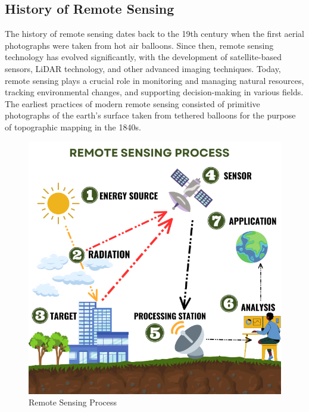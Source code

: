 \documentclass[conference]{IEEEtran}
\begin{document}
\subsection{History of Remote Sensing}
The history of remote sensing dates back to the 19th century when the first aerial photographs were taken from hot air balloons. Since then, remote sensing technology has evolved significantly, with the development of satellite-based sensors, LiDAR technology, and other advanced imaging techniques. Today, remote sensing plays a crucial role in monitoring and managing natural resources, tracking environmental changes, and supporting decision-making in various fields. The earliest practices of modern remote sensing consisted of primitive photographs of the earth’s surface taken from tethered balloons for the purpose of topographic mapping in the 1840s.

\begin{figure}
    \centering
    \includegraphics[width=\linewidth]{images/rs-process.png}
    \caption{Remote Sensing Process}
    \label{fig:remote-sensing-process}
\end{figure}
\end{document}
